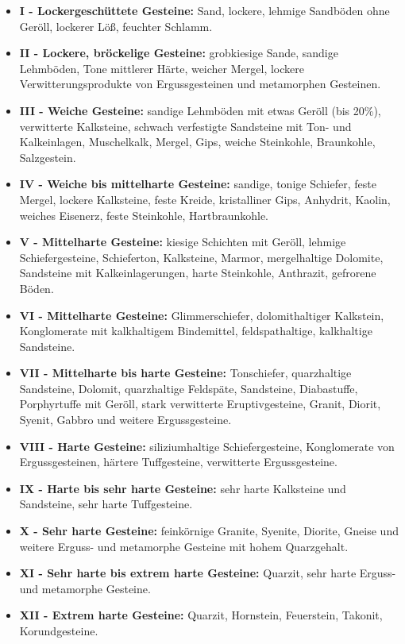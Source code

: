 \documentclass[12pt,a4paper,draft]{scrartcl} %
\begin{document}
\begin{itemize}
\item \textbf{I - Lockergeschüttete Gesteine: } Sand, lockere, lehmige Sandböden ohne Geröll, lockerer Löß, feuchter Schlamm.		
\item \textbf{II - Lockere, bröckelige Gesteine: } grobkiesige Sande, sandige Lehmböden, Tone mittlerer Härte, weicher Mergel, lockere Verwitterungsprodukte von Ergussgesteinen und metamorphen Gesteinen.
\item \textbf{III - Weiche Gesteine: } sandige Lehmböden mit etwas Geröll (bis 20\%), verwitterte Kalksteine, schwach verfestigte Sandsteine mit Ton- und Kalkeinlagen, Muschelkalk, Mergel, Gips, weiche Steinkohle, Braunkohle, Salzgestein.
\item \textbf{IV - Weiche bis mittelharte Gesteine: } sandige, tonige Schiefer, feste Mergel, lockere Kalksteine, feste Kreide, kristalliner Gips, Anhydrit, Kaolin, weiches Eisenerz, feste Steinkohle, Hartbraunkohle.
\item \textbf{V - Mittelharte Gesteine: } kiesige Schichten mit Geröll, lehmige Schiefergesteine, Schieferton, Kalksteine, Marmor, mergelhaltige Dolomite, Sandsteine mit Kalkeinlagerungen, harte Steinkohle, Anthrazit, gefrorene Böden.
\item \textbf{VI - Mittelharte Gesteine: } Glimmerschiefer, dolomithaltiger Kalkstein, Konglomerate mit kalkhaltigem Bindemittel, feldspathaltige, kalkhaltige Sandsteine.
\item \textbf{VII - Mittelharte bis harte Gesteine: } Tonschiefer, quarzhaltige Sandsteine, Dolomit, quarzhaltige Feldspäte, Sandsteine, Diabastuffe, Porphyrtuffe mit Geröll, stark verwitterte Eruptivgesteine, Granit, Diorit, Syenit, Gabbro und weitere Ergussgesteine.
\item \textbf{VIII - Harte Gesteine: } siliziumhaltige Schiefergesteine, Konglomerate von Ergussgesteinen, härtere Tuffgesteine, verwitterte Ergussgesteine.
\item \textbf{IX - Harte bis sehr harte Gesteine: } sehr harte Kalksteine und Sandsteine, sehr harte Tuffgesteine.
\item \textbf{X - Sehr harte Gesteine: } feinkörnige Granite, Syenite, Diorite, Gneise und weitere Erguss- und metamorphe Gesteine mit hohem Quarzgehalt.
\item \textbf{XI - Sehr harte bis extrem harte Gesteine: } Quarzit, sehr harte Erguss- und metamorphe Gesteine.
\item \textbf{XII - Extrem harte Gesteine: } Quarzit, Hornstein, Feuerstein, Takonit, Korundgesteine.
\end{itemize}
\end{document}
